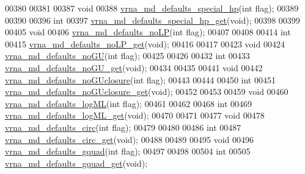 \begin{DoxyCode}
00380 
00381 
00387 \textcolor{keywordtype}{void}
00388 \hyperlink{group__model__details_gafff6449a02744add0308e653230c15fc}{vrna\_md\_defaults\_special\_hp}(\textcolor{keywordtype}{int} flag);
00389 
00390 
00396 \textcolor{keywordtype}{int}
00397 \hyperlink{group__model__details_ga1d68a6efdaa1253cc63fd9cd06452559}{vrna\_md\_defaults\_special\_hp\_get}(\textcolor{keywordtype}{void});
00398 
00399 
00405 \textcolor{keywordtype}{void}
00406 \hyperlink{group__model__details_ga2f88ffc393ac9d7987849c965fd29ea8}{vrna\_md\_defaults\_noLP}(\textcolor{keywordtype}{int} flag);
00407 
00408 
00414 \textcolor{keywordtype}{int}
00415 \hyperlink{group__model__details_ga934344888fbacaed538bbbfe910f2aa6}{vrna\_md\_defaults\_noLP\_get}(\textcolor{keywordtype}{void});
00416 
00417 
00423 \textcolor{keywordtype}{void}
00424 \hyperlink{group__model__details_ga98218f85c7a957a1d1ddf4627fdf5a39}{vrna\_md\_defaults\_noGU}(\textcolor{keywordtype}{int} flag);
00425 
00426 
00432 \textcolor{keywordtype}{int}
00433 \hyperlink{group__model__details_ga5faa7d4e536d7fe36ec25428c0cf2563}{vrna\_md\_defaults\_noGU\_get}(\textcolor{keywordtype}{void});
00434 
00435 
00441 \textcolor{keywordtype}{void}
00442 \hyperlink{group__model__details_gade5b9951d71ca2fb357a4e6c0c18ccd1}{vrna\_md\_defaults\_noGUclosure}(\textcolor{keywordtype}{int} flag);
00443 
00444 
00450 \textcolor{keywordtype}{int}
00451 \hyperlink{group__model__details_ga4f7fdad083243a5348d63320ddaa70f3}{vrna\_md\_defaults\_noGUclosure\_get}(\textcolor{keywordtype}{void});
00452 
00453 
00459 \textcolor{keywordtype}{void}
00460 \hyperlink{group__model__details_ga3de50a73455d88c3957386933b8e1f90}{vrna\_md\_defaults\_logML}(\textcolor{keywordtype}{int} flag);
00461 
00462 
00468 \textcolor{keywordtype}{int}
00469 \hyperlink{group__model__details_ga93f04e070d529c5d0bb87c9681f6ad29}{vrna\_md\_defaults\_logML\_get}(\textcolor{keywordtype}{void});
00470 
00471 
00477 \textcolor{keywordtype}{void}
00478 \hyperlink{group__model__details_ga4e1deb3e91a8a99e5c6dd905a5eb0186}{vrna\_md\_defaults\_circ}(\textcolor{keywordtype}{int} flag);
00479 
00480 
00486 \textcolor{keywordtype}{int}
00487 \hyperlink{group__model__details_gad3a7e58de344ad93a08925f58f94f6fb}{vrna\_md\_defaults\_circ\_get}(\textcolor{keywordtype}{void});
00488 
00489 
00495 \textcolor{keywordtype}{void}
00496 \hyperlink{group__model__details_ga0685ca2aeb39af76f2421fc308163dce}{vrna\_md\_defaults\_gquad}(\textcolor{keywordtype}{int} flag);
00497 
00498 
00504 \textcolor{keywordtype}{int}
00505 \hyperlink{group__model__details_gae645b8612f879eb38b45244fa9eddb9e}{vrna\_md\_defaults\_gquad\_get}(\textcolor{keywordtype}{void});

\end{DoxyCode}

